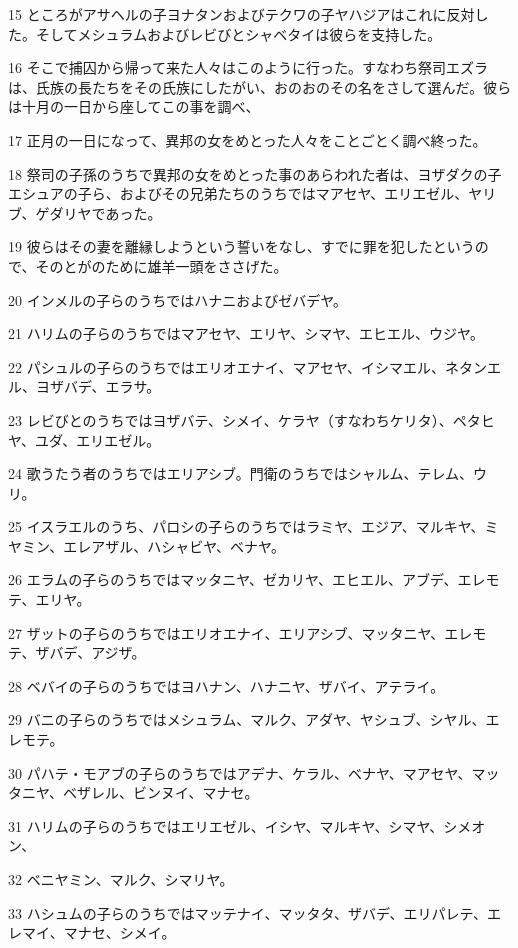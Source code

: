 \par 15 ところがアサヘルの子ヨナタンおよびテクワの子ヤハジアはこれに反対した。そしてメシュラムおよびレビびとシャベタイは彼らを支持した。
\par 16 そこで捕囚から帰って来た人々はこのように行った。すなわち祭司エズラは、氏族の長たちをその氏族にしたがい、おのおのその名をさして選んだ。彼らは十月の一日から座してこの事を調べ、
\par 17 正月の一日になって、異邦の女をめとった人々をことごとく調べ終った。
\par 18 祭司の子孫のうちで異邦の女をめとった事のあらわれた者は、ヨザダクの子エシュアの子ら、およびその兄弟たちのうちではマアセヤ、エリエゼル、ヤリブ、ゲダリヤであった。
\par 19 彼らはその妻を離縁しようという誓いをなし、すでに罪を犯したというので、そのとがのために雄羊一頭をささげた。
\par 20 インメルの子らのうちではハナニおよびゼバデヤ。
\par 21 ハリムの子らのうちではマアセヤ、エリヤ、シマヤ、エヒエル、ウジヤ。
\par 22 パシュルの子らのうちではエリオエナイ、マアセヤ、イシマエル、ネタンエル、ヨザバデ、エラサ。
\par 23 レビびとのうちではヨザバテ、シメイ、ケラヤ（すなわちケリタ）、ペタヒヤ、ユダ、エリエゼル。
\par 24 歌うたう者のうちではエリアシブ。門衛のうちではシャルム、テレム、ウリ。
\par 25 イスラエルのうち、パロシの子らのうちではラミヤ、エジア、マルキヤ、ミヤミン、エレアザル、ハシャビヤ、ベナヤ。
\par 26 エラムの子らのうちではマッタニヤ、ゼカリヤ、エヒエル、アブデ、エレモテ、エリヤ。
\par 27 ザットの子らのうちではエリオエナイ、エリアシブ、マッタニヤ、エレモテ、ザバデ、アジザ。
\par 28 ベバイの子らのうちではヨハナン、ハナニヤ、ザバイ、アテライ。
\par 29 バニの子らのうちではメシュラム、マルク、アダヤ、ヤシュブ、シヤル、エレモテ。
\par 30 パハテ・モアブの子らのうちではアデナ、ケラル、ベナヤ、マアセヤ、マッタニヤ、ベザレル、ビンヌイ、マナセ。
\par 31 ハリムの子らのうちではエリエゼル、イシヤ、マルキヤ、シマヤ、シメオン、
\par 32 ベニヤミン、マルク、シマリヤ。
\par 33 ハシュムの子らのうちではマッテナイ、マッタタ、ザバデ、エリパレテ、エレマイ、マナセ、シメイ。
